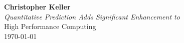 \begin{titlepage}
	\vspace*{\fill}
	\begin{center}
		\textbf{\huge Christopher Keller}\\[1cm]
        \textit{Quantitative Prediction Adds Significant Enhancement to \climatedge}\\ [.5cm]
		\normalsize High Performance Computing\\ [.5cm]
        \normalsize \today
	\end{center}
	\vspace*{\fill}
\end{titlepage}
